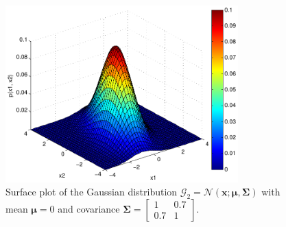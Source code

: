 \documentclass[a4paper,11pt]{article}
\newcommand{\V}[1]{\ensuremath{\mathbf{#1}}}
\newcommand{\mean}{\ensuremath{\boldsymbol{\mu}}}
\newcommand{\cov}{\ensuremath{\boldsymbol{\Sigma}}}
\newcommand{\npdf}{\ensuremath{\mathcal{N}}}
\begin{document}
\begin{figure}
  \begin{center}
    \caption[Surface plot of the Gaussian distribution with covariance $\cov_{1,1} = \cov_{2,2} = 1, \cov_{1,2} = \cov_{2,1} = 0.7$.]{Surface plot of the Gaussian distribution $\mathcal G_2 = \npdf(\V{x}; \mean, \cov)$ with mean $\mean = 0$ and covariance $\cov = \begin{bmatrix}1 & 0.7\\0.7 & 1\end{bmatrix}$.}
    \label{fig:plot3}
    \includegraphics[width=0.8\textwidth]{ex1plot3}
  \end{center}
\end{figure}
\end{document}
